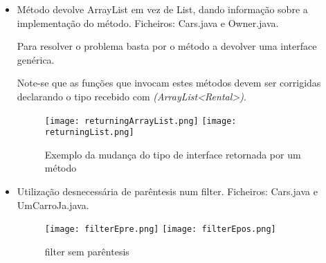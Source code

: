 \begin{itemize}
\item Método devolve ArrayList em vez de List, dando informação sobre a implementação do método.\newline
 Ficheiros: Cars.java e Owner.java.\newline


\par Para resolver o problema basta por o método a devolver uma interface genérica.\newline
\par Note-se que as funções que invocam estes métodos devem ser corrigidas declarando o tipo recebido com \textit{(ArrayList<Rental>)}.

\begin{figure}[H]

  \centering

  \texttt{[image: returningArrayList.png]}
  \texttt{[image: returningList.png]}

  \caption {Exemplo da mudança do tipo de interface retornada por um método}

  \label {fig22}

\end{figure}

\end{itemize}

\begin{itemize}
\item Utilização desnecessária de parêntesis num filter.\newline
 Ficheiros: Cars.java e UmCarroJa.java.\newline


\begin{figure}[H]

  \centering

  \texttt{[image: filterEpre.png]}
  \texttt{[image: filterEpos.png]}

  \caption {filter sem parêntesis}

  \label {fig23}

\end{figure}

\end{itemize}


